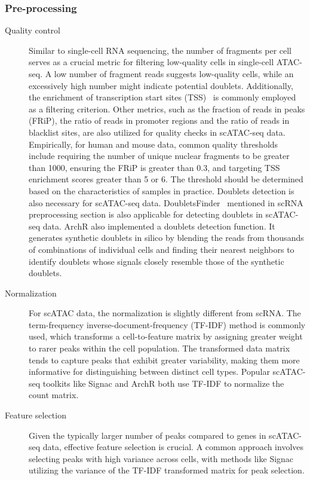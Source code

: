 \subsubsection{Pre-processing}
\begin{description}
	\item[Quality control] 
	Similar to single-cell RNA sequencing, the number of fragments per cell serves as a crucial metric for filtering low-quality cells in single-cell ATAC-seq. A low number of fragment reads suggests low-quality cells, while an excessively high number might indicate potential doublets. Additionally, the enrichment of transcription start sites (TSS)~\citep{Granja2021} is commonly employed as a filtering criterion. Other metrics, such as the fraction of reads in peaks (FRiP), the ratio of reads in promoter regions and the ratio of reads in blacklist sites, are also utilized for quality checks in scATAC-seq data. Empirically, for human and mouse data, common quality thresholds include requiring the number of unique nuclear fragments to be greater than 1000, ensuring the FRiP is greater than 0.3, and targeting TSS enrichment scores greater than 5 or 6. The threshold should be determined based on the characteristics of samples in practice. Doublets detection is also necessary for scATAC-seq data. DoubletsFinder~\citep{mcginnis2019doubletfinder} mentioned in scRNA preprocessing section is also applicable for detecting doublets in scATAC-seq data. ArchR\citep{Granja2021} also implemented a doublets detection function. It generates synthetic doublets in silico by blending the reads from thousands of combinations of individual cells and finding their nearest neighbors to identify doublets whose signals closely resemble those of the synthetic doublets.
	
	\item[Normalization] 
	For scATAC data, the normalization is slightly different from scRNA. The term-frequency inverse-document-frequency (TF-IDF) method is commonly used, which transforms a cell-to-feature matrix by assigning greater weight to rarer peaks within the cell population. The transformed data matrix tends to capture peaks that exhibit greater variability, making them more informative for distinguishing between distinct cell types. Popular scATAC-seq toolkits like Signac\citep{signac} and ArchR\citep{granja2019single} both use TF-IDF to normalize the count matrix.
	
	\item[Feature selection] 
	Given the typically larger number of peaks compared to genes in scATAC-seq data, effective feature selection is crucial. A common approach involves selecting peaks with high variance across cells, with methods like Signac\citep{signac} utilizing the variance of the TF-IDF transformed matrix for peak selection.
\end{description}
